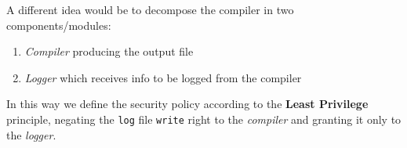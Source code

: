 A different idea would be to decompose the compiler in two components/modules:
\begin{enumerate}
   \item \textit{Compiler} producing the output file
   \item \textit{Logger} which receives info to be logged from the compiler
\end{enumerate}
In this way we define the security policy according to the \textbf{Least Privilege} principle, negating the \texttt{log} file \texttt{write} right to the \textit{compiler} and granting it only to the \textit{logger}.